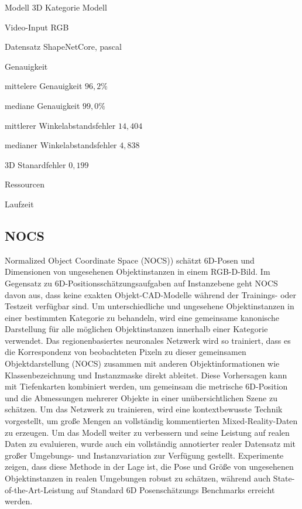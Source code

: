 \documentclass[a4paper, 11pt]{article}
\begin{document}
\begin{multicols*}{2}
    \begin{description*}
        \item[Modell] 3D Kategorie Modell
        \item[Video-Input] RGB
        \item[Datensatz] \Gls{ShapeNetCore}, \Gls{pascal}
        \item[Genauigkeit]
        \begin{itemize*}
            \item mittelere Genauigkeit $96,2\%$
            \item mediane Genauigkeit $99,0\%$
            \item mittlerer Winkelabstandsfehler $14,404$
            \item medianer Winkelabstandsfehler $4,838$
            \item 3D Stanardfehler $0,199$
        \end{itemize*}
        \item[Ressourcen]
        \item[Laufzeit]
    \end{description*}

    \subsection{NOCS}
    Normalized Object Coordinate Space (NOCS))\cite{NormalizedObjectCoordiante} schätzt 6D-Posen und Dimensionen von ungesehenen Objektinstanzen in einem RGB-D-Bild. Im Gegensatz zu 6D-Positionsschätzungsaufgaben auf Instanzebene geht NOCS davon aus, dass keine exakten Objekt-CAD-Modelle während der Trainings- oder Testzeit verfügbar sind. Um unterschiedliche und ungesehene Objektinstanzen in einer bestimmten Kategorie zu behandeln, wird eine gemeinsame kanonische Darstellung für alle möglichen Objektinstanzen innerhalb einer Kategorie verwendet. Das regionenbasiertes neuronales Netzwerk wird so trainiert, dass es die Korrespondenz von beobachteten Pixeln zu dieser gemeinsamen Objektdarstellung (NOCS) zusammen mit anderen Objektinformationen wie Klassenbezeichnung und Instanzmaske direkt ableitet. Diese Vorhersagen kann mit Tiefenkarten kombiniert werden, um gemeinsam die metrische 6D-Position und die Abmessungen mehrerer Objekte in einer unübersichtlichen Szene zu schätzen.
    Um das Netzwerk zu trainieren, wird eine kontextbewusste Technik vorgestellt, um große Mengen an vollständig kommentierten Mixed-Reality-Daten zu erzeugen. Um das Modell weiter zu verbessern und seine Leistung auf realen Daten zu evaluieren, wurde auch ein vollständig annotierter realer Datensatz mit großer Umgebungs- und Instanzvariation zur Verfügung gestellt.
    Experimente zeigen, dass diese Methode in der Lage ist, die Pose und Größe von ungesehenen Objektinstanzen in realen Umgebungen robust zu schätzen, während auch State-of-the-Art-Leistung auf Standard 6D Posenschätzungs Benchmarks erreicht werden.


\end{multicols*}
\end{document}
